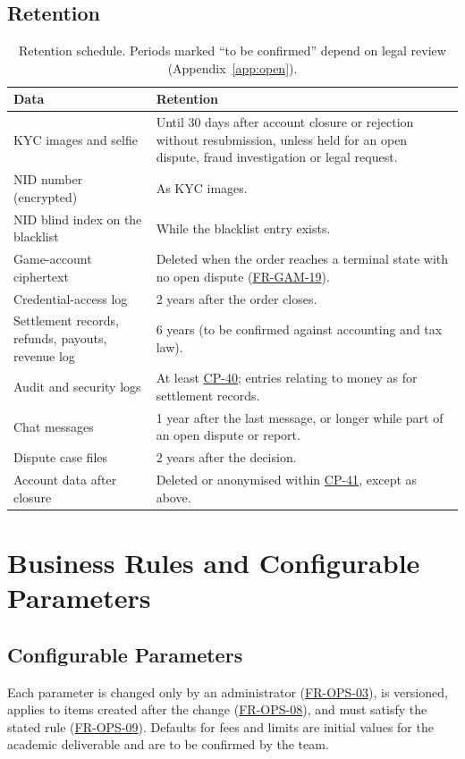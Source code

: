 \documentclass[11pt,a4paper]{report}
\newcommand{\rr}[1]{\hyperlink{#1}{#1}}
\newcommand{\cp}[1]{\hyperlink{#1}{#1}}
\begin{document}
\section{Retention}
\begin{table}[!htbp]
\centering
\small
\caption{Retention schedule. Periods marked ``to be confirmed'' depend on legal review (Appendix~\ref{app:open}).}
\label{tab:retention}
\begin{tabularx}{\textwidth}{@{}>{\raggedright\arraybackslash}p{4.4cm} X@{}}
\toprule
\textbf{Data} & \textbf{Retention} \\
\midrule
KYC images and selfie & Until 30 days after account closure or rejection without resubmission, unless held for an open dispute, fraud investigation or legal request. \\
NID number (encrypted) & As KYC images. \\
NID blind index on the blacklist & While the blacklist entry exists. \\
Game-account ciphertext & Deleted when the order reaches a terminal state with no open dispute (\rr{FR-GAM-19}). \\
Credential-access log & 2 years after the order closes. \\
Settlement records, refunds, payouts, revenue log & 6 years (to be confirmed against accounting and tax law). \\
Audit and security logs & At least \cp{CP-40}; entries relating to money as for settlement records. \\
Chat messages & 1 year after the last message, or longer while part of an open dispute or report. \\
Dispute case files & 2 years after the decision. \\
Account data after closure & Deleted or anonymised within \cp{CP-41}, except as above. \\
\bottomrule
\end{tabularx}
\end{table}

\chapter{Business Rules and Configurable Parameters}
\label{ch:params}

\section{Configurable Parameters}
Each parameter is changed only by an administrator (\rr{FR-OPS-03}), is versioned, applies to items created after the change (\rr{FR-OPS-08}), and must satisfy the stated rule (\rr{FR-OPS-09}). Defaults for fees and limits are initial values for the academic deliverable and are to be confirmed by the team.
\end{document}
